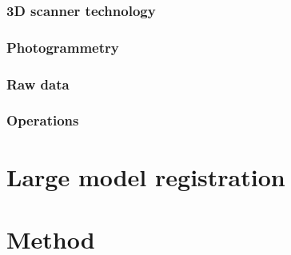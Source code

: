 \documentclass[a4paper,10pt]{scrreprt}
\begin{document}
\subsection{3D scanner technology}



\subsection{Photogrammetry}

\subsection{Raw data}

\subsection{Operations}


\chapter{Large model registration}


\chapter{Method}




\end{document}
